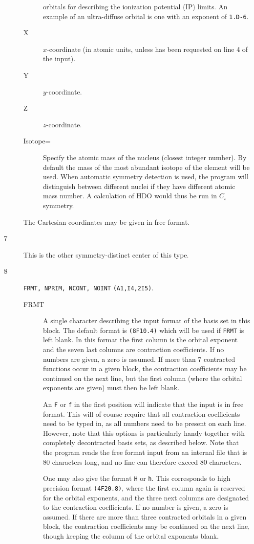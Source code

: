 \begin{description}
\begin{description}
orbitals for describing the ionization potential (IP) limits.
An example of an ultra-diffuse orbital is one with an exponent of \texttt{1.D-6}.
\item[X] $x$-coordinate (in atomic units, unless \angstrom{}
has been requested on line 4 of the input).
\item[Y] $y$-coordinate.
\item[Z] $z$-coordinate.
\item[Isotope=]  Specify the atomic mass of the nucleus (closest
  integer number). By default the mass of the most abundant isotope
  of the element will be used. When automatic symmetry detection is
  used, the program will distinguish between different nuclei if they
  have different atomic mass number. A calculation of HDO would thus
  be run in $C_s$ symmetry. 
\end{description}
The Cartesian coordinates may
be given in free format.
\item[7] This is the other symmetry-distinct center of this type.
\item[8] \verb|FRMT, NPRIM, NCONT, NOINT| {\tt (A1,I4,2I5)}.
\begin{description}
\item[FRMT] A single character describing the input format of the
basis set in this block. The default format is {\tt (8F10.4)} which
will be used if {\tt FRMT} is left blank. In this format
the first column is the orbital exponent and the seven last columns
are contraction coefficients. If no numbers are given, a zero is
assumed. If more than 7 contracted functions occur in a given block,
the contraction coefficients may be continued on the next line, but
the first column (where the orbital exponents are given) must then be
left blank.

An {\tt F} or {\tt f} in the first position will indicate that the
input is in free format. This will of course require that all
contraction coefficients need to be typed in, as all numbers need
to be present on each line. However, note that this options is
particularly handy together with completely decontracted basis
sets, as described below. Note that the program reads the free
format input from an internal file that is 80 characters long, and
no line can therefore exceed 80 characters.

One may also give the format {\tt H} or {\tt h}. This corresponds to
high precision format {\tt (4F20.8)}, where the first column again is
reserved for the orbital exponents, and the three next columns are
designated to the contraction coefficients. If no number is given, a zero
is assumed. If there are more than three contracted orbitals in a
given block, the contraction coefficients may be continued on the next
line, though keeping the column of the orbital exponents blank.


\end{description}
\end{description}
